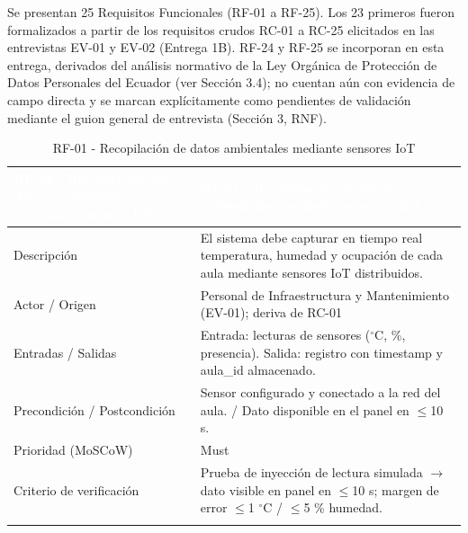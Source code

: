 
Se presentan 25 Requisitos Funcionales (RF-01 a RF-25). Los 23 primeros fueron formalizados a partir de los requisitos crudos RC-01 a RC-25 elicitados en las entrevistas EV-01 y EV-02 (Entrega 1B). RF-24 y RF-25 se incorporan en esta entrega, derivados del análisis normativo de la Ley Orgánica de Protección de Datos Personales del Ecuador (ver Sección 3.4); no cuentan aún con evidencia de campo directa y se marcan explícitamente como pendientes de validación mediante el guion general de entrevista (Sección 3, RNF).


\begingroup
\small
\begin{longtable}{|p{7.8cm}|p{7.8cm}|}
\hline
\cellcolor{sigagreen}\textcolor{white}{\textbf{RF-01 - Recopilación de datos ambientales mediante sensores IoT}} & \cellcolor{sigagreen}\textcolor{white}{\textbf{RF-01 - Recopilación de datos ambientales mediante sensores IoT}} \\ \hline
Descripción & El sistema debe capturar en tiempo real temperatura, humedad y ocupación de cada aula mediante sensores IoT distribuidos. \\ \hline
Actor / Origen & Personal de Infraestructura y Mantenimiento (EV-01); deriva de RC-01 \\ \hline
Entradas / Salidas & Entrada: lecturas de sensores ($^{\circ}$C, \%, presencia). Salida: registro con timestamp y aula\_id almacenado. \\ \hline
Precondición / Postcondición & Sensor configurado y conectado a la red del aula. / Dato disponible en el panel en $\leq$10 s. \\ \hline
Prioridad (MoSCoW) & Must \\ \hline
Criterio de verificación & Prueba de inyección de lectura simulada $\rightarrow$ dato visible en panel en $\leq$10 s; margen de error $\leq$1 $^{\circ}$C / $\leq$5 \% humedad. \\ \hline
\caption{RF-01 - Recopilación de datos ambientales mediante sensores IoT}
\end{longtable}
\endgroup

